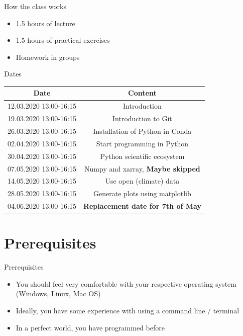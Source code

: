 \begin{frame}{How the class works}
	\begin{itemize}
		\item 1.5 hours of lecture
		\item 1.5 hours of practical exercises
		\item Homework in groups
	\end{itemize}
\end{frame}

\begin{frame}{Dates}

	\begin{table}

	\begin{tabular}{|c|c|}
		\hline
		Date&Content\\
		\hline
		12.03.2020	13:00-16:15	& Introduction \\

		19.03.2020	13:00-16:15&Introduction to Git\\

		26.03.2020	13:00-16:15&Installation of Python in Conda\\

		02.04.2020	13:00-16:15&Start programming in Python\\

		30.04.2020	13:00-16:15&Python scientific ecosystem\\

		07.05.2020	13:00-16:15&Numpy and xarray, \textbf{Maybe skipped}\\

		14.05.2020	13:00-16:15& Use open (climate) data\\

		28.05.2020	13:00-16:15&Generate plots using matplotlib\\

		04.06.2020  13:00-16:15&\textbf{Replacement date for 7th of May}\\
		\hline
	\end{tabular}
\end{table}

\end{frame}


\section{Prerequisites}

\begin{frame}{Prerequisites}
	\begin{itemize}
        \item You should feel very comfortable with your respective operating system (Windows, Linux, Mac OS)
		\item Ideally, you have some experience with using a command line / terminal
		\item In a perfect world, you have programmed before
	\end{itemize}
\end{frame}


